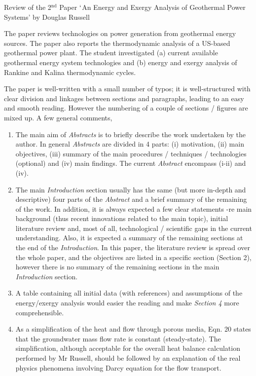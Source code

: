 \documentclass[14pt,twoside]{report}
\begin{document}

\clearpage


\bigskip

\begin{center}
  {\Large Review of the 2$^{\text{nd}}$ Paper $\lq$An Energy and Exergy Analysis of Geothermal Power Systems' by Douglas Russell}
\end{center}

The paper reviews technologies on power generation from geothermal energy sources. The paper also reports the thermodynamic analysis of a US-based geothermal power plant. The student investigated (a) current available geothermal energy system technologies and (b) energy and exergy analysis of Rankine and Kalina thermodynamic cycles.   

The paper is well-written with a small number of typos; it is well-structured with clear division and linkages between sections and paragraphs, leading to an easy and smooth reading. However the numbering of a couple of sections / figures are mixed up. A few general comments,
\begin{enumerate}
%
\item The main aim of {\it Abstracts} is to briefly describe the work undertaken by the author. In general {\it Abstracts} are divided in 4 parts: (i) motivation, (ii) main objectives, (iii) summary of the main procedures / techniques / technologies (optional) and (iv) main findings. The current {\it Abstract} encompass (i-ii) and (iv).
%
\item The main {\it Introduction} section usually has the same (but more in-depth and descriptive) four parts of the {\it Abstract} and a brief summary of the remaining of the work. In addition, it is always expected a few clear statements -re main background (thus recent innovations related to the main topic), initial literature review and, most of all, technological / scientific gaps in the current understanding. Also, it is expected a summary of the remaining sections at the end of the {\it Introduction}. In this paper, the literature review is spread over the whole paper, and the objectives are listed in a specific section (Section 2), however there is no summary of the remaining sections in the main {\it Introduction} section.   
%
\item A table containing all initial data (with references) and assumptions of the energy/exergy analysis would easier the reading and make {\it Section 4} more comprehensible. 
%
\item As a simplification of the heat and flow through porous media, Eqn. 20 states that the groundwater mass flow rate is constant (steady-state). The simplification, although acceptable for the overall heat balance calculation performed by Mr Russell, should be followed by an explanation of the real physics phenomena involving Darcy equation for the flow transport.  
% 
\end{enumerate}
\end{document}
